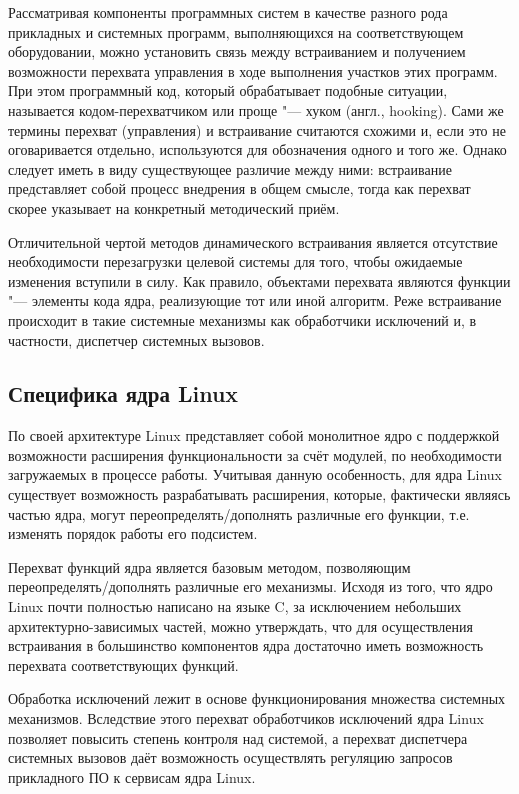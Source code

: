 \documentclass[10pt, a5paper]{article}
\begin{document}
Рассматривая компоненты программных систем в качестве разного рода прикладных и системных программ, выполняющихся на соответствующем оборудовании, можно установить связь между встраиванием и получением возможности перехвата управления в ходе выполнения участков этих программ. При этом программный код, который обрабатывает подобные ситуации, называется кодом-перехватчиком или проще "--- хуком (англ., hooking). Сами же термины перехват (управления) и встраивание считаются схожими и, если это не оговаривается отдельно, используются для обозначения одного и того же. Однако следует иметь в виду существующее различие между ними: встраивание представляет собой процесс внедрения в общем смысле, тогда как перехват скорее указывает на конкретный методический приём.

Отличительной чертой методов динамического встраивания является отсутствие необходимости перезагрузки целевой системы для того, чтобы ожидаемые изменения вступили в силу. Как правило, объектами перехвата являются функции "--- элементы кода ядра, реализующие тот или иной алгоритм. Реже встраивание происходит в такие системные механизмы как обработчики исключений и, в частности, диспетчер системных вызовов.

\subsection*{Специфика ядра Linux}

По своей архитектуре Linux представляет собой монолитное ядро с поддержкой возможности расширения функциональности за счёт модулей, по необходимости загружаемых в процессе работы. Учитывая данную особенность, для ядра Linux существует возможность разрабатывать расширения, которые, фактически являясь частью ядра, могут переопределять/дополнять различные его функции, т.е.  изменять порядок работы его подсистем.

Перехват функций ядра является базовым методом, позволяющим переопределять/дополнять различные его механизмы. Исходя из того, что ядро Linux почти полностью написано на языке C, за исключением небольших архитектурно-зависимых частей, можно утверждать, что для осуществления встраивания в большинство компонентов ядра достаточно иметь возможность перехвата соответствующих функций.

Обработка исключений лежит в основе функционирования множества системных механизмов. Вследствие этого перехват обработчиков исключений ядра Linux позволяет повысить степень контроля над системой, а перехват диспетчера системных вызовов даёт возможность осуществлять регуляцию запросов прикладного ПО к сервисам ядра Linux.
\end{document}
